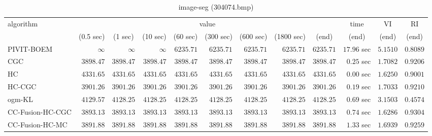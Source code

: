\begin{table}[H]
\scriptsize
\centering
\caption{image-seg (304074.bmp)}
\label{tab:anytimetable-image-seg-304074.bmp}
\begin{tabular}{lrrrrrrrrrrr}
\toprule
           algorithm &                                   \multicolumn{8}{c}{value} & \multicolumn{1}{c}{time}    & \multicolumn{1}{c}{VI}  & \multicolumn{1}{c}{RI} \\  
\cmidrule(lr){2-9}\cmidrule(lr){10-10} \cmidrule(lr){11-11} \cmidrule(lr){12-12}   
                     & \multicolumn{1}{c}{(0.5 sec)} & \multicolumn{1}{c}{(1 sec)} & \multicolumn{1}{c}{(10 sec)} & \multicolumn{1}{c}{(60 sec)} & \multicolumn{1}{c}{(300 sec)} & \multicolumn{1}{c}{(600 sec)} & \multicolumn{1}{c}{(1800 sec)} & \multicolumn{1}{c}{(end)} & \multicolumn{1}{c}{(end)}    & \multicolumn{1}{c}{(end)}   & \multicolumn{1}{c}{(end)}  \\ \midrule 
          PIVIT-BOEM & $\infty$ & $\infty$ & $\infty$ & $      6235.71$ & $      6235.71$ & $      6235.71$ & $      6235.71$ & $      6235.71$ & $        17.96$ sec    & $       5.1510$  & $       0.8089$ \\ 
                 CGC & $      3898.47$ & $      3898.47$ & $      3898.47$ & $      3898.47$ & $      3898.47$ & $      3898.47$ & $      3898.47$ & $      3898.47$ & $         0.25$ sec    & $       1.7082$  & $       0.9206$ \\ 
                  HC & $      4331.65$ & $      4331.65$ & $      4331.65$ & $      4331.65$ & $      4331.65$ & $      4331.65$ & $      4331.65$ & $      4331.65$ & $         0.00$ sec    & $       1.6250$  & $       0.9001$ \\ 
              HC-CGC & $      3901.26$ & $      3901.26$ & $      3901.26$ & $      3901.26$ & $      3901.26$ & $      3901.26$ & $      3901.26$ & $      3901.26$ & $         0.19$ sec    & $       1.7033$  & $       0.9210$ \\ 
              ogm-KL & $      4129.57$ & $      4128.25$ & $      4128.25$ & $      4128.25$ & $      4128.25$ & $      4128.25$ & $      4128.25$ & $      4128.25$ & $         0.69$ sec    & $       3.1503$  & $       0.4574$ \\ 
    CC-Fusion-HC-CGC & $      3893.13$ & $      3893.13$ & $      3893.13$ & $      3893.13$ & $      3893.13$ & $      3893.13$ & $      3893.13$ & $      3893.13$ & $         0.74$ sec    & $       1.6286$  & $       0.9304$ \\ 
     CC-Fusion-HC-MC & $      3891.88$ & $      3891.88$ & $      3891.88$ & $      3891.88$ & $      3891.88$ & $      3891.88$ & $      3891.88$ & $      3891.88$ & $         1.33$ sec    & $       1.6939$  & $       0.9259$ \\ 

\end{tabular}
\end{table}
